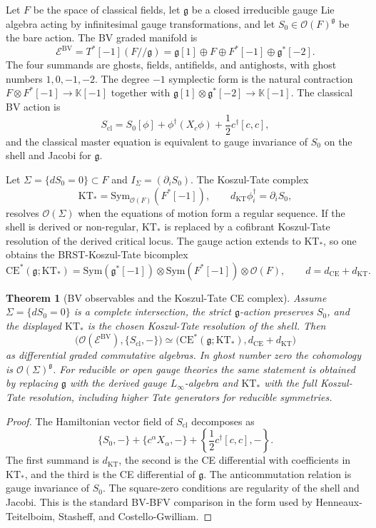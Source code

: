 \documentclass[11pt]{amsart}
\providecommand{\KK}{\mathbb{K}}
\providecommand{\gfrak}{\mathfrak{g}}
\providecommand{\BV}{\mathrm{BV}}
\providecommand{\KT}{\mathrm{KT}}
\providecommand{\CE}{\mathrm{CE}}
\providecommand{\cE}{\mathcal{E}}
\providecommand{\cO}{\mathcal{O}}
\providecommand{\Sym}{\mathrm{Sym}}
\theoremstyle{plain}
\newtheorem{theorem}{Theorem}[section]
\theoremstyle{definition}
\theoremstyle{remark}
\begin{document}
Let $F$ be the space of classical fields, let $\gfrak$ be a closed
irreducible gauge Lie algebra acting by infinitesimal gauge
transformations, and let $S_0\in\cO(F)^{\gfrak}$ be the bare action.
The BV graded manifold is
\[
  \cE^\BV =
  T^*[-1](F/\!/\gfrak)
  =
  \gfrak[1]\oplus F\oplus F^*[-1]\oplus\gfrak^*[-2].
\]
The four summands are ghosts, fields, antifields, and antighosts, with
ghost numbers $1,0,-1,-2$.  The degree $-1$ symplectic form is the
natural contraction
$F\otimes F^*[-1]\to\KK[-1]$ together with
$\gfrak[1]\otimes\gfrak^*[-2]\to\KK[-1]$.  The classical BV action is
\[
  S_{\mathrm{cl}}
  =
  S_0[\phi]
  + \phi^\dagger(X_c\phi)
  + \frac{1}{2}c^\dagger[c,c],
\]
and the classical master equation is equivalent to gauge invariance of
$S_0$ on the shell and Jacobi for $\gfrak$.

Let $\Sigma=\{dS_0=0\}\subset F$ and
$I_\Sigma=(\partial_i S_0)$.  The Koszul-Tate complex
\[
  \KT_* =
  \Sym_{\cO(F)}(F^*[-1]),
  \qquad
  d_\KT\phi_i^\dagger=\partial_iS_0,
\]
resolves $\cO(\Sigma)$ when the equations of motion form a regular
sequence.  If the shell is derived or non-regular, $\KT_*$ is replaced
by a cofibrant Koszul-Tate resolution of the derived critical locus.
The gauge action extends to $\KT_*$, so one obtains the
BRST-Koszul-Tate bicomplex
\[
  \CE^*(\gfrak;\KT_*)
  =
  \Sym(\gfrak^*[-1])
  \otimes
  \Sym(F^*[-1])
  \otimes
  \cO(F),
  \qquad d=d_\CE+d_\KT .
\]

\begin{theorem}[BV observables and the Koszul-Tate CE complex]
\label{thm:bv-ce-ktshell}
Assume $\Sigma=\{dS_0=0\}$ is a complete intersection, the strict
$\gfrak$-action preserves $S_0$, and the displayed $\KT_*$ is the chosen
Koszul-Tate resolution of the shell.  Then
\[
  \bigl(\cO(\cE^\BV),\{S_{\mathrm{cl}},-\}\bigr)
  \simeq
  \bigl(\CE^*(\gfrak;\KT_*),d_\CE+d_\KT\bigr)
\]
as differential graded commutative algebras.  In ghost number zero the
cohomology is $\cO(\Sigma)^{\gfrak}$.  For reducible or open gauge
theories the same statement is obtained by replacing $\gfrak$ with the
derived gauge $L_\infty$-algebra and $\KT_*$ with the full
Koszul-Tate resolution, including higher Tate generators for reducible
symmetries.
\end{theorem}

\begin{proof}
The Hamiltonian vector field of $S_{\mathrm{cl}}$ decomposes as
\[
  \{S_0,-\}
  +\{c^\alpha X_\alpha,-\}
  +\left\{\frac{1}{2}c^\dagger[c,c],-\right\}.
\]
The first summand is $d_\KT$, the second is the CE differential with
coefficients in $\KT_*$, and the third is the CE differential of
$\gfrak$.  The anticommutation relation is gauge invariance of $S_0$.
The square-zero conditions are regularity of the shell and Jacobi.
This is the standard BV-BFV comparison in the form used by
Henneaux-Teitelboim, Stasheff, and Costello-Gwilliam.
\end{proof}
\end{document}
